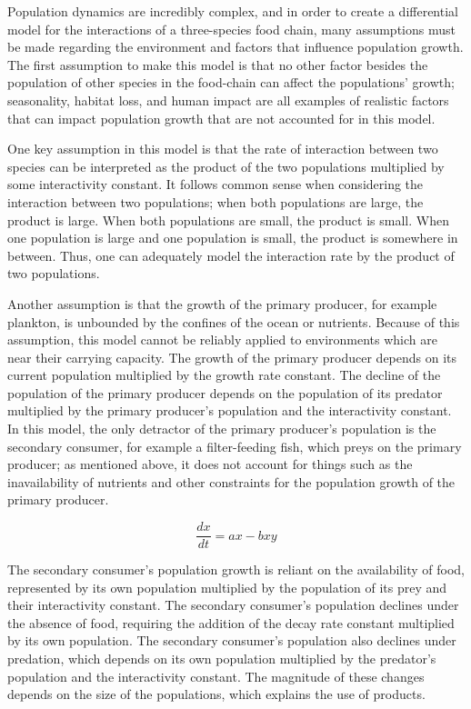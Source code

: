 \documentclass[11pt,oneside]{article}
\begin{document}
	Population dynamics are incredibly complex, and in order to create a differential model for the interactions of a three-species food chain, many assumptions must be made regarding the environment and factors that influence population growth. The first assumption to make this model is that no other factor besides the population of other species in the food-chain can affect the populations' growth; seasonality, habitat loss, and human impact are all examples of realistic factors that can impact population growth that are not accounted for in this model.
	
	One key assumption in this model is that the rate of interaction between two species can be interpreted as the product of the two populations multiplied by some interactivity constant. It follows common sense when considering the interaction between two populations; when both populations are large, the product is large. When both populations are small, the product is small. When one population is large and one population is small, the product is somewhere in between. Thus, one can adequately model the interaction rate by the product of two populations.
	
	Another assumption is that the growth of the primary producer, for example plankton, is unbounded by the confines of the ocean or nutrients. Because of this assumption, this model cannot be reliably applied to environments which are near their carrying capacity. The growth of the primary producer depends on its current population multiplied by the growth rate constant. The decline of the population of the primary producer depends on the population of its predator multiplied by the primary producer's population and the interactivity constant. In this model, the only detractor of the primary producer's population is the secondary consumer, for example a filter-feeding fish, which preys on the primary producer; as mentioned above, it does not account for things such as the inavailability of nutrients and other constraints for the population growth of the primary producer.
	
	\begin{equation}
	\frac{dx}{dt} = ax - bxy
	\end{equation}
	
	The secondary consumer's population growth is reliant on the availability of food, represented by its own population multiplied by the population of its prey and their interactivity constant. The secondary consumer's population declines under the absence of food, requiring the addition of the decay rate constant multiplied by its own population. The secondary consumer's population also declines under predation, which depends on its own population multiplied by the predator's population and the interactivity constant. The magnitude of these changes depends on the size of the populations, which explains the use of products.
	
\end{document}
